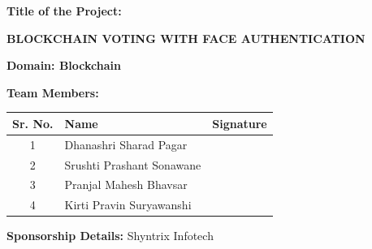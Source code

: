 \documentclass[12pt,a4paper]{report}
\begin{document}
\begin{titlepage}
\begin{center}
		\vspace{0.15cm}
		
		{\normalsize\bfseries
			Title of the Project:
		}
		
		\vspace{0.05cm}
		
		{\Large\bfseries
			BLOCKCHAIN VOTING WITH FACE AUTHENTICATION
		}
		
		
		\vspace{0.10cm}
		
		{\normalsize\bfseries
			Domain: Blockchain
		}
		
		
		
		\vspace{0.10cm}
		
		{\normalsize\bfseries
			Team Members:
		}
		
		\vspace{0.04cm}
		
		\begin{tabular}{|c|p{7.2cm}|p{3cm}|}
			\hline
			\textbf{Sr. No.} & \textbf{Name} & \textbf{Signature} \\
			\hline
			1 & Dhanashri Sharad Pagar & \\[0.20cm]
			\hline
			2 & Srushti Prashant Sonawane & \\[0.20cm]
			\hline
			3 & Pranjal Mahesh Bhavsar & \\[0.20cm]
			\hline
			4 & Kirti Pravin Suryawanshi & \\[0.20cm]
			\hline
		\end{tabular}
		
		
		\vspace{0.08cm}
		
		{\normalsize\bfseries
			Sponsorship Details:
		}
		{\small
			Shyntrix Infotech
		}
		

\vspace{0.05cm}


\end{center}
\end{titlepage}
\end{document}
